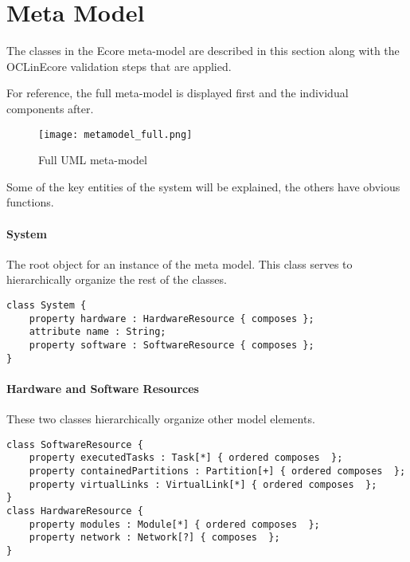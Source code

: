 \pagebreak
\section{Meta Model}\label{metamodel}
The classes in the Ecore meta-model are described in this section along
with the OCLinEcore validation steps that are applied.

For reference, the full meta-model is displayed first and the individual
components after.
\begin{figure}[h]
\centering
\texttt{[image: metamodel\_full.png]}
\caption{Full UML meta-model}
\label{fig:fullmodel} %
\end{figure}
Some of the key entities of the system will be explained, the others have obvious functions.
\paragraph{System}
The root object for an instance of the meta model. This class
serves to hierarchically organize the rest of the classes.
\begin{lstlisting}[caption=System constraints]
class System {
    property hardware : HardwareResource { composes };
    attribute name : String;
    property software : SoftwareResource { composes };
}
\end{lstlisting}

\paragraph{Hardware and Software Resources}
These two classes hierarchically organize other model elements.
\begin{lstlisting}[caption=Hardware and Software constraints]
class SoftwareResource {
    property executedTasks : Task[*] { ordered composes  };
    property containedPartitions : Partition[+] { ordered composes  };
    property virtualLinks : VirtualLink[*] { ordered composes  };
}
class HardwareResource {
    property modules : Module[*] { ordered composes  };
    property network : Network[?] { composes  };
}
\end{lstlisting}


